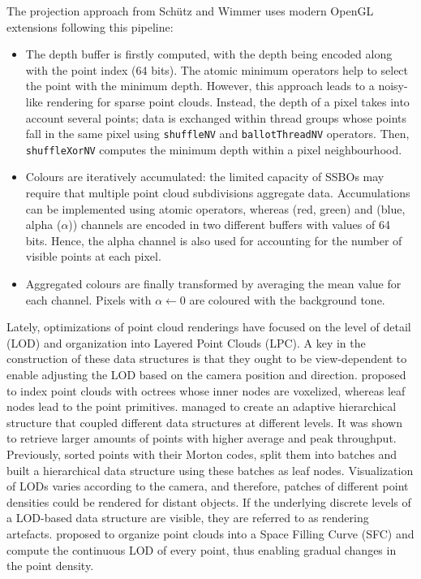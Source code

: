 \begin{kaobox}[frametitle=Compute shader core proposed by Schütz and Wimmer]
The projection approach from Schütz and Wimmer \cite{schutz_rendering_2021} uses modern OpenGL extensions following this pipeline:
\begin{itemize}
    \item The depth buffer is firstly computed, with the depth being encoded along with the point index (64 bits). The atomic minimum operators help to select the point with the minimum depth. However, this approach leads to a noisy-like rendering for sparse point clouds. Instead, the depth of a pixel takes into account several points; data is exchanged within thread groups whose points fall in the same pixel using \verb|shuffleNV| and \verb|ballotThreadNV| operators. Then, \verb|shuffleXorNV| computes the minimum depth within a pixel neighbourhood.
    \item Colours are iteratively accumulated: the limited capacity of SSBOs may require that multiple point cloud subdivisions aggregate data. Accumulations can be implemented using atomic operators, whereas (red, green) and (blue, alpha ($\alpha$)) channels are encoded in two different buffers with values of 64 bits. Hence, the alpha channel is also used for accounting for the number of visible points at each pixel.
    \item Aggregated colours are finally transformed by averaging the mean value for each channel. Pixels with $\alpha \gets 0$ are coloured with the background tone. 
\end{itemize}
\end{kaobox}

Lately, optimizations of point cloud renderings have focused on the level of detail (LOD) and organization into Layered Point Clouds (LPC). A key in the construction of these data structures is that they ought to be view-dependent to enable adjusting the LOD based on the camera position and direction. \cite{schutz_gpu-accelerated_2023} proposed to index point clouds with octrees whose inner nodes are voxelized, whereas leaf nodes lead to the point primitives. \cite{ogayar-anguita_nested_2023} managed to create an adaptive hierarchical structure that coupled different data structures at different levels. It was shown to retrieve larger amounts of points with higher average and peak throughput. Previously, \cite{schutz_software_2022} sorted points with their Morton codes, split them into batches and built a hierarchical data structure using these batches as leaf nodes. Visualization of LODs varies according to the camera, and therefore, patches of different point densities could be rendered for distant objects. If the underlying discrete levels of a LOD-based data structure are visible, they are referred to as rendering artefacts. \cite{van_oosterom_organizing_2022} proposed to organize point clouds into a Space Filling Curve (SFC) and compute the continuous LOD of every point, thus enabling gradual changes in the point density. 

